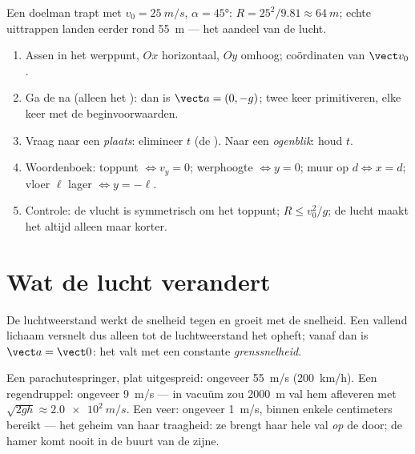 \begin{example}[Doeltrap]\label{ex:g12:projectile-motion:kick}
Een doelman trapt met $v_0 = \qty{25}{m/s}$, $\alpha = \ang{45}$:
$R = 25^2/9.81 \approx \qty{64}{m}$; echte uittrappen landen eerder rond
\qty{55}{m} --- het aandeel van de lucht.
\end{example}

\begin{method}\label{met:g12:projectile-motion:method}
\begin{enumerate}
  \item Assen in het werppunt, $Ox$ horizontaal, $Oy$ omhoog; coördinaten
        van $\vect v_0$.
  \item Ga de  na (alleen het ): dan is $\vect a = (0,-g)$;
        twee keer primitiveren, elke keer met de beginvoorwaarden.
  \item Vraag naar een \emph{plaats}: elimineer $t$ (de ). Naar een
        \emph{ogenblik}: houd $t$.
  \item Woordenboek: toppunt $\Leftrightarrow v_y = 0$; werphoogte
        $\Leftrightarrow y = 0$; muur op $d \Leftrightarrow x = d$; vloer
        $\ell$ lager $\Leftrightarrow y = -\ell$.
  \item Controle: de vlucht is symmetrisch om het toppunt; $R \leq v_0^2/g$;
        de lucht maakt het altijd alleen maar korter.
\end{enumerate}
\end{method}

\section{Wat de lucht verandert}

\begin{definition}[Grenssnelheid]\label{def:g12:projectile-motion:terminal}
De luchtweerstand werkt de snelheid tegen en groeit met de snelheid. Een
vallend lichaam versnelt dus alleen tot de luchtweerstand het  opheft;
vanaf dan is $\vect a = \vect 0$: het valt met een constante
\emph{grenssnelheid}.
\end{definition}

\begin{example}\label{ex:g12:projectile-motion:airorders}
Een parachutespringer, plat uitgespreid: ongeveer \qty{55}{m/s}
(\qty{200}{km/h}). Een regendruppel: ongeveer \qty{9}{m/s} --- in vacuüm zou
\qty{2000}{m} val hem afleveren met $\sqrt{2gh} \approx \qty{2.0e2}{m/s}$.
Een veer: ongeveer \qty{1}{m/s}, binnen enkele centimeters bereikt --- het
geheim van haar traagheid: ze brengt haar hele val \emph{op} de
 door; de hamer komt nooit in de buurt van de zijne.
\end{example}

